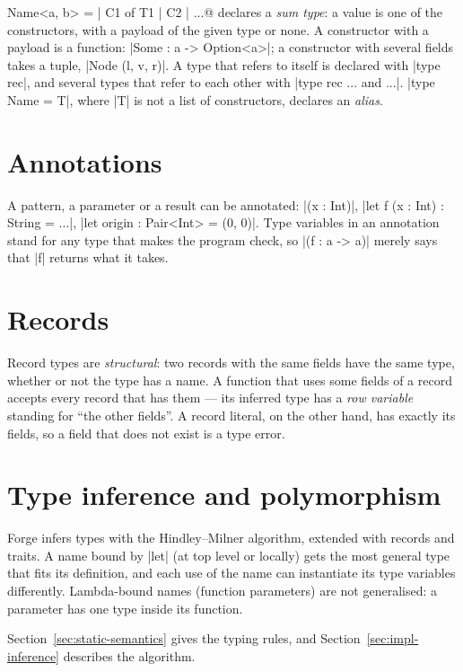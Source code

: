 \fc@type Name<a, b> = | C1 of T1 | C2 | ...@ declares a \emph{sum type}: a
value is one of the constructors, with a payload of the given type or none.
A constructor with a payload is a function: \fc|Some : a -> Option<a>|; a
constructor with several fields takes a tuple, \fc|Node (l, v, r)|.
A type that refers to itself is declared with \fc|type rec|, and several
types that refer to each other with \fc|type rec ... and ...|.
\fc|type Name = T|, where \fc|T| is not a list of constructors, declares an
\emph{alias}.



\section{Annotations}
A pattern, a parameter or a result can be annotated: \fc|(x : Int)|,
\fc|let f (x : Int) : String = ...|, \fc|let origin : Pair<Int> = (0, 0)|.
Type variables in an annotation stand for any type that makes the program
check, so \fc|(f : a -> a)| merely says that \fc|f| returns what it takes.


\section{Records}
\label{sec:records}
Record types are \emph{structural}: two records with the same fields have the
same type, whether or not the type has a name. A function that uses some
fields of a record accepts every record that has them --- its inferred type
has a \emph{row variable} standing for ``the other fields''. A record
literal, on the other hand, has exactly its fields, so a field that does not
exist is a type error.


\section{Type inference and polymorphism}
\label{sec:inference}

Forge infers types with the Hindley--Milner algorithm, extended with records
and traits. A name bound by \fc|let| (at top level or locally) gets the most
general type that fits its definition, and each use of the name can
instantiate its type variables differently. Lambda-bound names (function
parameters) are not generalised: a parameter has one type inside its
function.


Section~\ref{sec:static-semantics} gives the typing rules, and
Section~\ref{sec:impl-inference} describes the algorithm.
